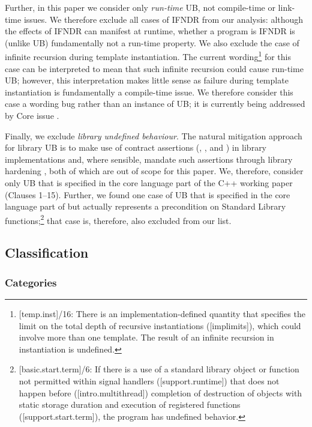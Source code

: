 Further, in this paper we consider only \emph{run-time} UB, not compile-time or link-time issues. We therefore exclude all cases of IFNDR from our analysis: although the effects of IFNDR can manifest at runtime, whether a program is IFNDR is (unlike UB) fundamentally not a run-time property.
We also exclude the case of infinite recursion during template instantiation. The current wording\footnote{[temp.inst]/16: There is an implementation-defined quantity that specifies the limit on the total depth of recursive instantiations ([implimits]), which could involve more than one template. The result of an infinite recursion in instantiation is undefined.} for this case can be interpreted to mean that such infinite recursion could cause run-time UB; however, this interpretation makes little sense as failure during template instantiation is fundamentally a compile-time issue. We therefore consider this case a wording bug rather than an instance of UB; it is currently being addressed by Core issue \cite{CWG3034}.

Finally, we exclude \emph{library undefined behaviour}. The natural mitigation approach for library UB is to make use of contract assertions (, , and ) in library implementations and, where sensible, mandate such assertions through library hardening \cite{P3471R4}, both of which are out of scope for this paper. We, therefore, consider only UB that is specified in the core language part of the C++ working paper (Clauses 1--15). Further, we found one case of UB that is specified in the core language part of \cite{N5008} but actually represents a precondition on Standard Library functions;\footnote{[basic.start.term]/6: If there is a use of a standard library object or function not permitted within signal handlers ([support.runtime]) that does not happen before ([intro.multithread]) completion of destruction of objects with static storage duration and execution of  registered functions ([support.start.term]), the program has undefined behavior.}
that case is, therefore, also excluded from our list.


\subsection{Classification}


\subsubsection{Categories}
\label{categories}

